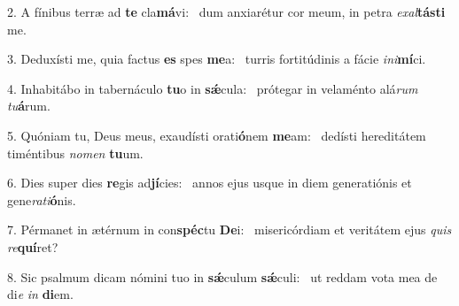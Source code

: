 2. A fínibus terræ ad \textbf{te} cla\textbf{má}vi: \ast\  dum anxiarétur cor meum, in petra \textit{ex}\textit{al}\textbf{tás}\textbf{ti} me.\

3. Deduxísti me, quia factus \textbf{es} spes \textbf{me}a: \ast\  turris fortitúdinis a fácie \textit{in}\textit{i}\textbf{mí}ci.\

4. Inhabitábo in tabernáculo \textbf{tu}o in \textbf{sǽ}cula: \ast\  prótegar in velaménto alá\textit{rum} \textit{tu}\textbf{á}rum.\

5. Quóniam tu, Deus meus, exaudísti orati\textbf{ó}nem \textbf{me}am: \ast\  dedísti hereditátem timéntibus \textit{no}\textit{men} \textbf{tu}um.\

6. Dies super dies \textbf{re}gis ad\textbf{jí}cies: \ast\  annos ejus usque in diem generatiónis et gene\textit{ra}\textit{ti}\textbf{ó}nis.\

7. Pérmanet in ætérnum in con\textbf{spéc}tu \textbf{De}i: \ast\  misericórdiam et veritátem ejus \textit{quis} \textit{re}\textbf{quí}ret?\

8. Sic psalmum dicam nómini tuo in \textbf{sǽ}culum \textbf{sǽ}culi: \ast\  ut reddam vota mea de di\textit{e} \textit{in} \textbf{di}em.\

